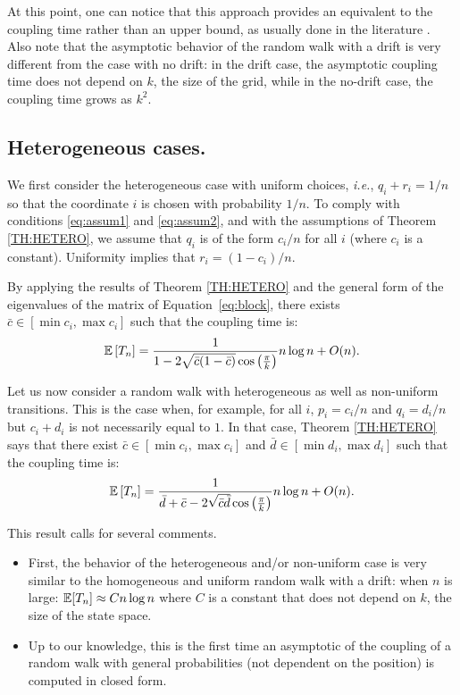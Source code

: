 \documentclass{aptpub}
\newcommand\expect[1]{\mathchoice{\bexpect{#1}}{\sexpect{#1}}{\sexpect{#1}}{\sexpect{#1}}}
\newcommand\bexpect[1]{\mathbb{E}\left[#1\right]}
\newcommand\sexpect[1]{\mathbb{E}[#1]}
\newcommand\p[1]{\left(#1\right)}
\begin{document}
At this point, one can notice that this approach provides an
equivalent to the coupling time rather than an upper bound, as usually
done in the literature \cite{peres}.  Also note that the asymptotic
behavior of the random walk with a drift is very different from the
case with no drift: in the drift case, the asymptotic coupling time
does not depend on $k$, the size of the grid, while in the no-drift
case, the coupling time grows as $k^2$.



\subsection{Heterogeneous cases.}

We first consider the heterogeneous case with uniform choices,
\emph{i.e.}, $q_i+ r_i = 1/n$ so that the coordinate $i$ is chosen
with probability $1/n$.  To comply with conditions \eqref{eq:assum1}
and \eqref{eq:assum2}, and with the assumptions of Theorem
\ref{TH:HETERO}, we assume that $q_i$ is of the form $c_i/n$ for all
$i$ (where $c_i$ is a constant).  Uniformity implies that
$r_i = (1-c_i)/n$.


By applying the results of Theorem \ref{TH:HETERO} and the general
form of the eigenvalues of the matrix of Equation~\eqref{eq:block},
there exists $\bar{c}\in [\min c_i,\max c_i]$ such that the coupling
time is:
\begin{equation*}
  \expect{T_n} =   \frac{1}{1-2\sqrt{\bar{c}(1-\bar{c})}\cos\p{\frac{\pi}{k}}} n\log n +
  O(n). 
\end{equation*}

Let us now consider a random walk with heterogeneous as well as
non-uniform transitions.  This is the case when, for example, for all
$i$, $p_i =c_i/n$ and $q_i = d_i/n$ but $c_i+d_i$ is not necessarily
equal to $1$.  In that case, Theorem \ref{TH:HETERO} says that there
exist $\bar{c}\in[\min c_i,\max c_i]$ and
$\bar{d}\in[\min d_i,\max d_i]$ such that the coupling time is:
\begin{equation*}
  \expect{T_n} = \frac{1}{\bar{d}+\bar{c}-2\sqrt{\bar{c}\bar{d}}\cos\p{\frac{\pi}{k}}} n\log n +
  O(n). 
\end{equation*}

This result calls for several comments.
\begin{itemize}
\item First, the behavior of the heterogeneous and/or non-uniform case
  is very similar to the homogeneous and uniform random walk with a
  drift: when $n$ is large: $\expect{T_n} \approx C n\log n$ where $C$
  is a constant that does not depend on $k$, the size of the state
  space.
\item Up to our knowledge, this is the first time an asymptotic of the
  coupling of a random walk with general probabilities (not dependent
  on the position) is computed in closed form.
\end{itemize}
\end{document}
